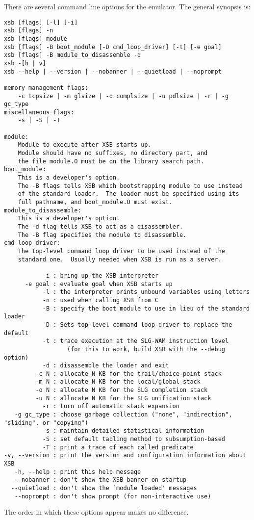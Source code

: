 There are several command line options for the emulator. The general 
synopsis is:
{\small 
\begin{verbatim}
xsb [flags] [-l] [-i]
xsb [flags] -n
xsb [flags] module
xsb [flags] -B boot_module [-D cmd_loop_driver] [-t] [-e goal]
xsb [flags] -B module_to_disassemble -d
xsb -[h | v]
xsb --help | --version | --nobanner | --quietload | --noprompt

memory management flags:
    -c tcpsize | -m glsize | -o complsize | -u pdlsize | -r | -g gc_type
miscellaneous flags:
    -s | -S | -T

module:
    Module to execute after XSB starts up.
    Module should have no suffixes, no directory part, and
    the file module.O must be on the library search path.
boot_module:
    This is a developer's option.
    The -B flags tells XSB which bootstrapping module to use instead
    of the standard loader.  The loader must be specified using its
    full pathname, and boot_module.O must exist.
module_to_disassemble:
    This is a developer's option.
    The -d flag tells XSB to act as a disassembler.
    The -B flag specifies the module to disassemble.
cmd_loop_driver:
    The top-level command loop driver to be used instead of the
    standard one.  Usually needed when XSB is run as a server.

           -i : bring up the XSB interpreter
      -e goal : evaluate goal when XSB starts up
           -l : the interpreter prints unbound variables using letters
           -n : used when calling XSB from C
           -B : specify the boot module to use in lieu of the standard loader
           -D : Sets top-level command loop driver to replace the default
           -t : trace execution at the SLG-WAM instruction level
                  (for this to work, build XSB with the --debug option)
           -d : disassemble the loader and exit
         -c N : allocate N KB for the trail/choice-point stack
         -m N : allocate N KB for the local/global stack
         -o N : allocate N KB for the SLG completion stack
         -u N : allocate N KB for the SLG unification stack
           -r : turn off automatic stack expansion
   -g gc_type : choose garbage collection ("none", "indirection", "sliding", or "copying") 
           -s : maintain detailed statistical information
           -S : set default tabling method to subsumption-based
           -T : print a trace of each called predicate
-v, --version : print the version and configuration information about XSB
   -h, --help : print this help message
   --nobanner : don't show the XSB banner on startup
  --quietload : don't show the `module loaded' messages
   --noprompt : don't show prompt (for non-interactive use)

\end{verbatim}
}
The order in which these options appear makes no difference.

